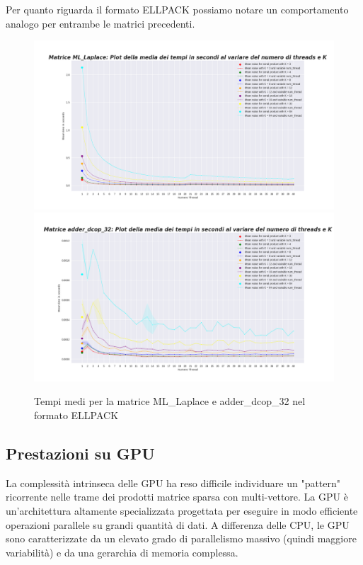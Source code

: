\documentclass{article}
\begin{document}
Per quanto riguarda il formato ELLPACK possiamo notare un comportamento analogo per entrambe le matrici precedenti.
\begin{figure}[H]
\centering
\includegraphics[width=\textwidth]{Immagini/ELLPACK_CPU_ML_Laplace.png}
\includegraphics[width=\textwidth]{Immagini/ELLPACK_CPU_adder_dcop_32.png}
\caption{Tempi medi per la matrice ML\_Laplace e adder\_dcop\_32 nel formato ELLPACK}
\end{figure}

\subsection{Prestazioni su GPU}
La complessità intrinseca delle GPU ha reso difficile individuare un "pattern" ricorrente nelle trame dei prodotti matrice sparsa con multi-vettore. La GPU è un'architettura altamente specializzata progettata per eseguire in modo efficiente operazioni parallele su grandi quantità di dati. A differenza delle CPU, le GPU sono caratterizzate da un elevato grado di parallelismo massivo (quindi maggiore variabilità) e da una gerarchia di memoria complessa.\\
\end{document}
